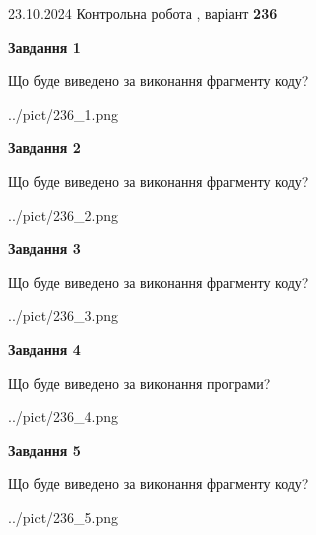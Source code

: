 \documentclass[12pt, ukrainian]{article}
\begin{document}
{\Large{23.10.2024 Контрольна робота , варіант  \No \textbf { 236 }\par}}
{
\begin {large}
{\begin {center}\textbf{Завдання 1}\end {center}}

Що буде виведено за виконання фрагменту коду?\par
\begin{center}
	{../pict/236_1.png}
\end{center}
\newpage

{\begin {center}\textbf{Завдання 2}\end {center}}

Що буде виведено за виконання фрагменту коду?\par
\begin{center}
	{../pict/236_2.png}
\end{center}
\newpage

{\begin {center}\textbf{Завдання 3}\end {center}}

Що буде виведено за виконання фрагменту коду?\par
\begin{center}
	{../pict/236_3.png}
\end{center}
\newpage

{\begin {center}\textbf{Завдання 4}\end {center}}

Що буде виведено за виконання програми?\par
\begin{center}
	{../pict/236_4.png}
\end{center}
\newpage

{\begin {center}\textbf{Завдання 5}\end {center}}

Що буде виведено за виконання фрагменту коду?\par
\begin{center}
	{../pict/236_5.png}
\end{center}
\newpage


\end{large}}
\end{document}

